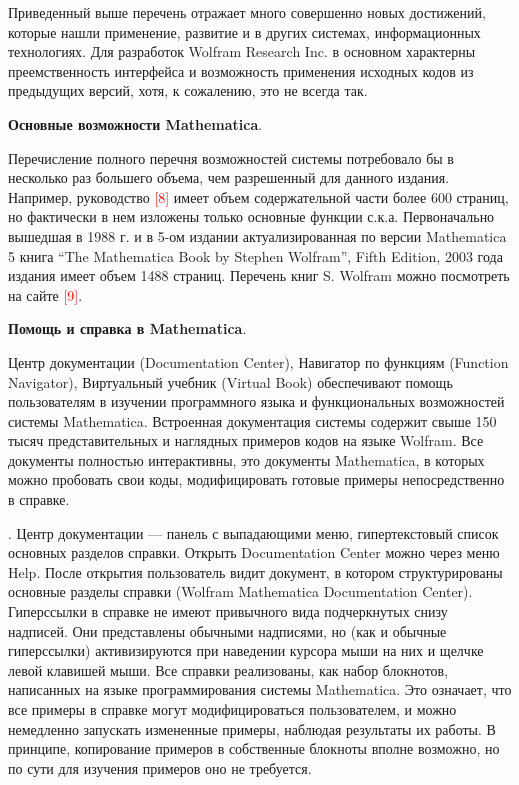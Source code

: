 Приведенный выше перечень отражает много совершенно новых достижений, которые нашли применение, развитие и в других системах, информационных технологиях. Для разработок Wolfram Research Inc. в основном характерны преемственность интерфейса и возможность применения исходных кодов из предыдущих версий, хотя, к сожалению, это не всегда так. 

\textbf{Основные возможности Mathematica}.

Перечисление полного перечня возможностей системы потребовало бы в несколько раз большего объема, чем разрешенный для данного издания. Например, руководство \textcolor{red}{[8]} имеет объем содержательной части более 600 страниц, но фактически в нем изложены только основные функции с.к.а. 
Первоначально вышедшая в 1988 г. и в 5-ом издании актуализированная по версии Mathematica 5 книга “The Mathematica Book by Stephen Wolfram”, Fifth Edition, 2003 года издания имеет объем 1488 страниц. Перечень книг S. Wolfram можно посмотреть на сайте \textcolor{red}{[9]}.

\textbf{Помощь и справка в Mathematica}.

Центр документации (Documentation Center), Навигатор по функциям (Function Navigator), Виртуальный учебник (Virtual Book) обеспечивают помощь пользователям в изучении программного языка и функциональных возможностей системы Mathematica.
Встроенная документация системы содержит свыше 150 тысяч представительных и наглядных примеров кодов на языке Wolfram. Все документы полностью интерактивны, это документы Mathematica, в которых можно пробовать свои коды, модифицировать готовые примеры непосредственно в справке.

. Центр документации --- панель с выпадающими меню, гипертекстовый список основных разделов справки. Открыть Documentation Center можно через меню Help. После открытия пользователь видит документ, в котором структурированы основные разделы справки (Wolfram Mathematica Documentation Center). 
Гиперссылки в справке не имеют привычного вида подчеркнутых снизу надписей. Они представлены обычными надписями, но (как и обычные гиперссылки) активизируются при наведении курсора мыши на них и щелчке левой клавишей мыши. 
Все справки реализованы, как набор блокнотов, написанных на языке программирования системы Mathematica. Это означает, что все примеры в справке могут модифицироваться пользователем, и можно немедленно запускать измененные примеры, наблюдая результаты их работы. В принципе, копирование примеров в собственные блокноты вполне возможно, но по сути для изучения примеров оно не требуется.

